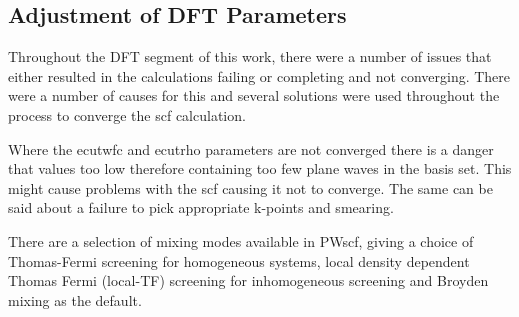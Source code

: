 \subsection{Adjustment of DFT Parameters}

Throughout the DFT segment of this work, there were a number of issues that either resulted in the calculations failing or completing and not converging.  There were a number of causes for this and several solutions were used throughout the process to converge the \acrshort{scf} calculation.

Where the ecutwfc and ecutrho parameters are not converged there is a danger that values too low therefore containing too few plane waves in the basis set.  This might cause problems with the \acrshort{scf} causing it not to converge.  The same can be said about a failure to pick appropriate k-points and smearing.

There are a selection of mixing modes available in PWscf, giving a choice of Thomas-Fermi screening for homogeneous systems, local density dependent Thomas Fermi (local-TF) screening for inhomogeneous screening and Broyden mixing as the default.  


